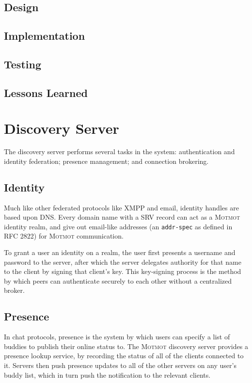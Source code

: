 \documentclass{sig-alternate}
\newcommand\Motmot{\textsc{Motmot}\xspace}
\begin{document}
\subsection{Design}

\subsection{Implementation}

\subsection{Testing}

\subsection{Lessons Learned}


\section{Discovery Server}

The discovery server performs several tasks in the system: authentication and
identity federation; presence management; and connection brokering.

\subsection{Identity}

Much like other federated protocols like XMPP and email, identity handles are
based upon DNS. Every domain name with a SRV record can act as a \Motmot
identity realm, and give out email-like addresses (an \verb`addr-spec` as
defined in RFC 2822) for \Motmot communication.

To grant a user an identity on a realm, the user first presents a username and
password to the server, after which the server delegates authority for that name
to the client by signing that client's key. This key-signing process is the
method by which peers can authenticate securely to each other without a
centralized broker.

\subsection{Presence}

In chat protocols, presence is the system by which users can specify a list of
buddies to publish their online status to. The \Motmot discovery server provides
a presence lookup service, by recording the status of all of the clients
connected to it. Servers then push presence updates to all of the other servers
on any user's buddy list, which in turn push the notification to the relevant
clients.
\end{document}
